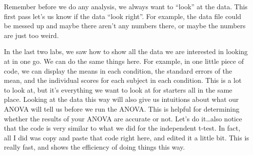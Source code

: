 \documentclass[]{book}
\begin{document}
Remember before we do any analysis, we always want to ``look'' at the
data. This first pass let's us know if the data ``look right''. For
example, the data file could be messed up and maybe there aren't any
numbers there, or maybe the numbers are just too weird.

In the last two labs, we saw how to show all the data we are interested
in looking at in one go. We can do the same things here. For example, in
one little piece of code, we can display the means in each condition,
the standard errors of the mean, and the individual scores for each
subject in each condition. This is a lot to look at, but it's everything
we want to look at for starters all in the same place. Looking at the
data this way will also give us intuitions about what our ANOVA will
tell us before we run the ANOVA. This is helpful for determining whether
the results of your ANOVA are accurate or not. Let's do it\ldots{}also
notice that the code is very similar to what we did for the independent
t-test. In fact, all I did was copy and paste that code right here, and
edited it a little bit. This is really fast, and shows the efficiency of
doing things this way.
\end{document}
